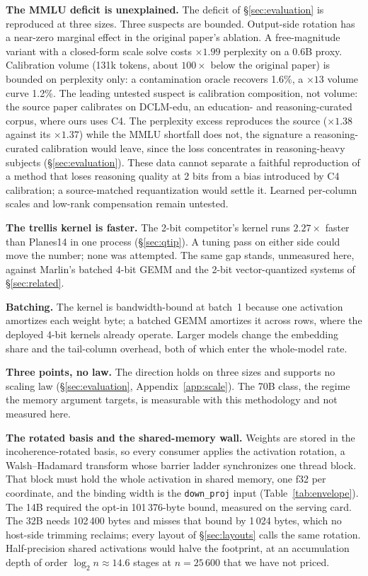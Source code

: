 \textbf{The MMLU deficit is unexplained.} The deficit of
\S\ref{sec:evaluation} is reproduced at three sizes. Three suspects are
bounded. Output-side rotation has a near-zero marginal effect
in the original paper's ablation. A free-magnitude variant with a
closed-form scale solve costs $\times1.99$ perplexity on a 0.6B proxy.
Calibration volume (131k tokens, about $100\times$ below the original
paper) is bounded on perplexity only: a contamination oracle recovers 1.6\%,
a $\times13$ volume curve 1.2\%. The leading untested suspect is
calibration composition, not volume: the source paper calibrates on
DCLM-edu, an education- and reasoning-curated corpus, where ours uses C4.
The perplexity excess reproduces the source ($\times1.38$ against its
$\times1.37$) while the MMLU shortfall does not, the signature a
reasoning-curated calibration would leave, since the loss concentrates in
reasoning-heavy subjects (\S\ref{sec:evaluation}). These data cannot
separate a faithful reproduction of a method that loses reasoning quality
at 2 bits from a bias introduced by C4 calibration; a source-matched
requantization would settle it. Learned per-column scales and low-rank
compensation remain untested.

\textbf{The trellis kernel is faster.} The 2-bit competitor's kernel runs
$2.27\times$ faster than Planes14 in one process (\S\ref{sec:qtip}). A
tuning pass on either side could move the number; none was attempted. The
same gap stands, unmeasured here, against Marlin's batched 4-bit GEMM and
the 2-bit vector-quantized systems of \S\ref{sec:related}.

\textbf{Batching.} The kernel is bandwidth-bound at batch~1 because one
activation amortizes each weight byte; a batched GEMM amortizes it across
rows, where the deployed 4-bit kernels already operate. Larger models change
the embedding share and the tail-column overhead, both of which enter the
whole-model rate.

\textbf{Three points, no law.} The direction holds on three sizes and
supports no scaling law (\S\ref{sec:evaluation}, Appendix~\ref{app:scale}).
The 70B class, the regime the memory argument targets, is measurable with
this methodology and not measured here.

\textbf{The rotated basis and the shared-memory wall.} Weights are stored
in the incoherence-rotated basis, so every consumer applies the activation
rotation, a Walsh--Hadamard transform whose barrier ladder synchronizes one
thread block. That block must hold the whole activation in shared memory,
one f32 per coordinate, and the binding width is the \texttt{down\_proj}
input (Table~\ref{tab:envelope}). The 14B required the opt-in 101\,376-byte
bound, measured on the serving card. The 32B needs 102\,400 bytes and
misses that bound by 1\,024 bytes, which no host-side trimming reclaims;
every layout of \S\ref{sec:layouts} calls the same rotation.
Half-precision shared activations would halve the footprint, at an
accumulation depth of order $\log_2 n \approx 14.6$ stages at
$n = 25\,600$ that we have not priced.

